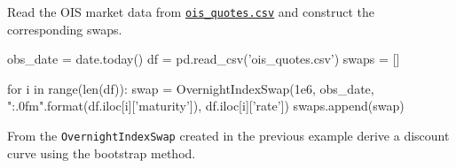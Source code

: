\begin{question}
Read the OIS market data from \href{https://raw.githubusercontent.com/matteosan1/finance_course/master/input_files/ois_quotes.csv}{\texttt{ois\_quotes.csv}} and construct the corresponding swaps.
\end{question}

\cprotEnv\begin{solution}

\begin{ipython}
obs_date = date.today()
df = pd.read_csv('ois_quotes.csv')
swaps = []

for i in range(len(df)):
    swap = OvernightIndexSwap(1e6,
                              obs_date,
                              "{:.0f}m".format(df.iloc[i]['maturity']),
                              df.iloc[i]['rate'])
    swaps.append(swap)
\end{ipython}
\end{solution}

\begin{question}
From the \texttt{OvernightIndexSwap} created in the previous example derive a discount curve using the bootstrap method.
\end{question}

